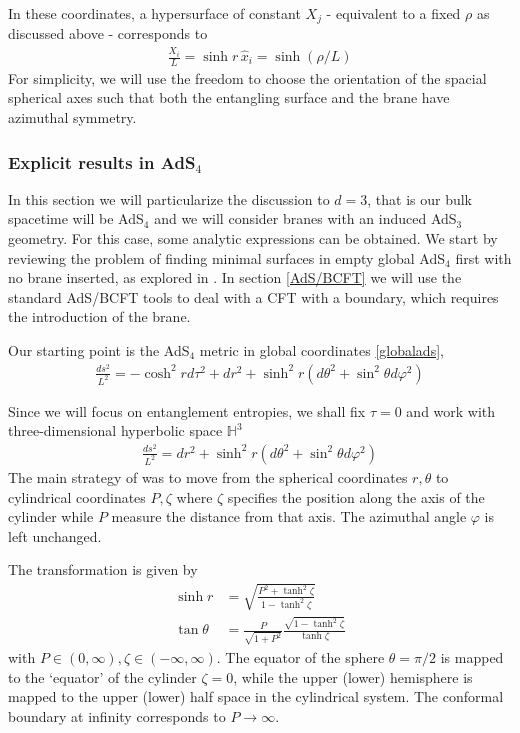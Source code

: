 In these coordinates, a hypersurface of constant $X_j$ - equivalent to a fixed $\rho$ as discussed above - corresponds to
\begin{align}\label{brane}
\frac{X_i}{L}=\sinh r\, \hat{x}_i=\sinh \left(  \rho/L \right)
\end{align}
For simplicity, we will use the freedom to choose the orientation of the spacial spherical axes such that both the entangling surface and the brane have azimuthal symmetry.

\subsubsection{Explicit results in AdS$_{4}$}

In this section we will particularize the discussion to $d=3$, that is our bulk spacetime will be AdS$_4$ and we will consider branes with an induced AdS$_3$ geometry. For this case, some analytic expressions can be obtained. We start by reviewing the problem of finding minimal surfaces in empty global AdS$_4$ first with no brane inserted, as explored in \cite{Krtous:2014pva}. In section \ref{AdS/BCFT} we will use the standard AdS/BCFT tools \cite{Takayanagi:2011zk} to deal with a CFT with a boundary, which requires the introduction of the brane.

Our starting point is the AdS$_4$ metric in global coordinates \eqref{globalads},
\begin{align}\label{}
\frac{ds^2}{L^2}=-\cosh^2 r d\tau^2+dr^2+\sinh^2r \left( d\theta^2+\sin^2\theta d\varphi^2 \right)
\end{align}

Since we will focus on entanglement entropies, we shall fix $\tau=0$ and work with three-dimensional hyperbolic space $\mathbb H^3$
\begin{align}\label{H3}
\frac{ds^2}{L^2}=dr^2+\sinh^2r \left( d\theta^2+\sin^2\theta d\varphi^2 \right)
\end{align}
The main strategy of \cite{Krtous:2014pva} was to move from the spherical coordinates $r,\theta$ to cylindrical coordinates $P,\zeta$ where $\zeta$ specifies the position along the axis of the cylinder while $P$ measure the distance from that axis. The azimuthal angle $\varphi$ is left unchanged.



The transformation is given by
\begin{align}\label{}
\sinh r&=\sqrt{\frac{P^2+\tanh^2\zeta}{1-\tanh^2\zeta}}\\
\tan\theta&=\frac{P}{\sqrt{1+P^2}}\frac{\sqrt{1-\tanh^2\zeta}}{\tanh\zeta}
\end{align}
with $P\in (0,\infty),\zeta\in(-\infty,\infty)$. The equator of the sphere $\theta=\pi/2$ is mapped to the `equator' of the cylinder $\zeta=0$, while the upper (lower) hemisphere is mapped to the upper (lower) half space in the cylindrical system. The conformal boundary at infinity corresponds to $P\to \infty$.

